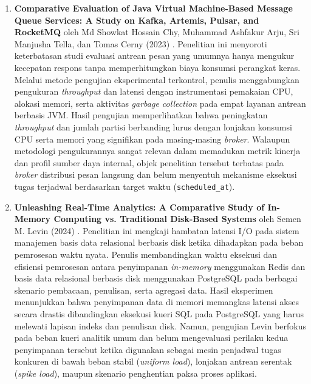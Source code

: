 \begin{enumerate}[noitemsep]
	\item \textbf{Comparative Evaluation of Java Virtual Machine-Based Message Queue Services: A Study on Kafka, Artemis, Pulsar, and RocketMQ} oleh Md Showkat Hossain Chy, Muhammad Ashfakur Arju, Sri Manjusha Tella, dan Tomas Cerny (2023) \cite{chy2023comparative}. Penelitian ini menyoroti keterbatasan studi evaluasi antrean pesan yang umumnya hanya mengukur kecepatan respons tanpa memperhitungkan biaya konsumsi perangkat keras. Melalui metode pengujian eksperimental terkontrol, penulis menggabungkan pengukuran \textit{throughput} dan latensi dengan instrumentasi pemakaian CPU, alokasi memori, serta aktivitas \textit{garbage collection} pada empat layanan antrean berbasis JVM. Hasil pengujian memperlihatkan bahwa peningkatan \textit{throughput} dan jumlah partisi berbanding lurus dengan lonjakan konsumsi CPU serta memori yang signifikan pada masing-masing \textit{broker}. Walaupun metodologi pengukurannya sangat relevan dalam memadukan metrik kinerja dan profil sumber daya internal, objek penelitian tersebut terbatas pada \textit{broker} distribusi pesan langsung dan belum menyentuh mekanisme eksekusi tugas terjadwal berdasarkan target waktu (\texttt{scheduled\_at}).
	\item \textbf{Unleashing Real-Time Analytics: A Comparative Study of In-Memory Computing vs. Traditional Disk-Based Systems} oleh Semen M. Levin (2024) \cite{levin2024unleashing}. Penelitian ini mengkaji hambatan latensi I/O pada sistem manajemen basis data relasional berbasis disk ketika dihadapkan pada beban pemrosesan waktu nyata. Penulis membandingkan waktu eksekusi dan efisiensi pemrosesan antara penyimpanan \textit{in-memory} menggunakan Redis dan basis data relasional berbasis disk menggunakan PostgreSQL pada berbagai skenario pembacaan, penulisan, serta agregasi data. Hasil eksperimen menunjukkan bahwa penyimpanan data di memori memangkas latensi akses secara drastis dibandingkan eksekusi kueri SQL pada PostgreSQL yang harus melewati lapisan indeks dan penulisan disk. Namun, pengujian Levin berfokus pada beban kueri analitik umum dan belum mengevaluasi perilaku kedua penyimpanan tersebut ketika digunakan sebagai mesin penjadwal tugas konkuren di bawah beban stabil (\textit{uniform load}), lonjakan antrean serentak (\textit{spike load}), maupun skenario penghentian paksa proses aplikasi.

\end{enumerate}

